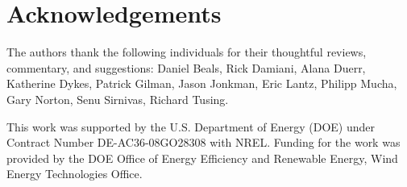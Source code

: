 \chapter*{Acknowledgements}
The authors thank the following individuals for their thoughtful
reviews, commentary, and suggestions: Daniel Beals, Rick Damiani, Alana
Duerr, Katherine Dykes, Patrick Gilman, Jason Jonkman, Eric Lantz,
Philipp Mucha, Gary Norton, Senu Sirnivas, Richard Tusing.

This work was supported by the U.S. Department of Energy (DOE) under
Contract Number DE-AC36-08GO28308 with NREL. Funding for the work was
provided by the DOE Office of Energy Efficiency and Renewable Energy,
Wind Energy Technologies Office.
